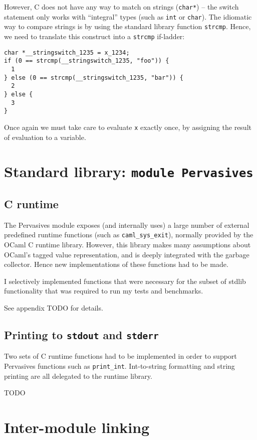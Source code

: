 \documentclass[12pt,a4paper,twoside,openright]{report}
\begin{document}
However, C does not have any way to match on strings (\lstinline!char*!) -- the
switch statement only works with ``integral'' types (such as \lstinline!int! or
\lstinline!char!). The idiomatic way to compare strings is by using the
standard library function \lstinline!strcmp!. Hence, we need to translate this
construct into a \lstinline!strcmp! if-ladder:
\begin{lstlisting}
char *__stringswitch_1235 = x_1234;
if (0 == strcmp(__stringswitch_1235, "foo")) {
  1
} else (0 == strcmp(__stringswitch_1235, "bar")) {
  2
} else {
  3
}\end{lstlisting}
Once again we must take care to evaluate \lstinline!x! exactly once, by
assigning the result of evaluation to a variable.

\section{Standard library: \texttt{module Pervasives}}

\subsection{C runtime}

The Pervasives module exposes (and internally uses) a large number of external
predefined runtime functions (such as \lstinline!caml_sys_exit!), normally
provided by the OCaml C runtime library. However, this library makes many
assumptions about OCaml's tagged value representation, and is deeply integrated
with the garbage collector. Hence new implementations of these functions had to
be made.

I selectively implemented functions that were necessary for the subset of
stdlib functionality that was required to run my tests and benchmarks.

See appendix TODO for details.

\subsection{Printing to \texttt{stdout} and \texttt{stderr}}\label{pervasives-printing}

Two sets of C runtime functions had to be implemented in order to support
Pervasives functions such as \lstinline!print_int!. Int-to-string formatting
and string printing are all delegated to the runtime library.

TODO

\section{Inter-module linking}
\end{document}
